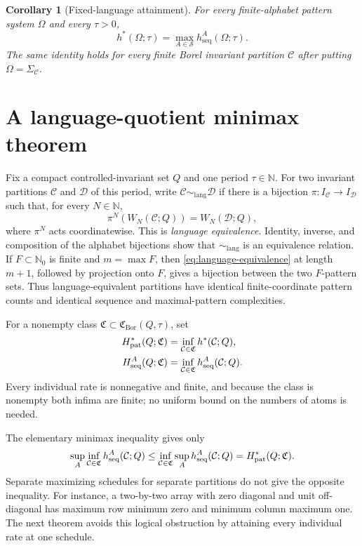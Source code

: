 \documentclass[11pt,reqno]{amsart}
\numberwithin{equation}{section}
\newtheorem{corollary}[theorem]{Corollary}
\theoremstyle{definition}
\newcommand{\N}{\mathbb N}
\newcommand{\Nzero}{\mathbb N_0}
\newcommand{\C}{\mathcal C}
\newcommand{\D}{\mathcal D}
\newcommand{\hseq}{h_{\mathrm{seq}}}
\newcommand{\hpat}{h^{*}}
\newcommand{\Bor}{\mathrm{Bor}}
\newcommand{\lang}{\mathrm{lang}}
\begin{document}
\begin{corollary}[Fixed-language attainment]\label{cor:fixed}
For every finite-alphabet pattern system $\Omega$ and every $\tau>0$,
\begin{equation}\label{eq:fixed-attainment}
 \hpat(\Omega;\tau)=\max_{A\in\mathscr S}\hseq^A(\Omega;\tau).
\end{equation}
The same identity holds for every finite Borel invariant partition $\C$ after
putting $\Omega=\Sigma_\C$.
\end{corollary}


\section{A language-quotient minimax theorem}\label{sec:minimax}

Fix a compact controlled-invariant set $Q$ and one period $\tau\in\N$.
For two invariant partitions $\C$ and $\D$ of this period, write
$\C\sim_{\lang}\D$ if there is a bijection
$\pi:I_\C\to I_\D$ such that, for every $N\in\N$,
\begin{equation}\label{eq:language-equivalence}
 \pi^N(W_N(\C;Q))=W_N(\D;Q),
\end{equation}
where $\pi^N$ acts coordinatewise.  This is \emph{language equivalence}.
Identity, inverse, and composition of the alphabet bijections show that
$\sim_{\lang}$ is an equivalence relation.  If $F\subset\Nzero$ is finite and
$m=\max F$, then \eqref{eq:language-equivalence} at length $m+1$, followed by
projection onto $F$, gives a bijection between the two $F$-pattern sets.
Thus language-equivalent partitions have identical finite-coordinate pattern
counts and identical sequence and maximal-pattern complexities.

For a nonempty class $\mathfrak C\subset\mathfrak C_{\Bor}(Q,\tau)$, set
\begin{align}
 H_{\rm pat}^*(Q;\mathfrak C)
 &=\inf_{\C\in\mathfrak C}\hpat(\C;Q),
 \label{eq:system-pattern}\\
 H_{\rm seq}^A(Q;\mathfrak C)
 &=\inf_{\C\in\mathfrak C}\hseq^A(\C;Q).
 \label{eq:system-sequence}
\end{align}
Every individual rate is nonnegative and finite, and because the class is nonempty both
infima are finite; no uniform bound on the numbers of atoms is needed.

The elementary minimax inequality gives only
\begin{align*}
 \sup_A\inf_{\C\in\mathfrak C}\hseq^A(\C;Q)
 \le\inf_{\C\in\mathfrak C}\sup_A\hseq^A(\C;Q)
 =H_{\rm pat}^*(Q;\mathfrak C).
\end{align*}
Separate maximizing schedules for separate partitions do not give the
opposite inequality. For instance, a two-by-two array with zero diagonal
and unit off-diagonal has maximum row minimum zero and minimum column
maximum one. The next theorem avoids this logical obstruction by
attaining every individual rate at one schedule.
\end{document}
